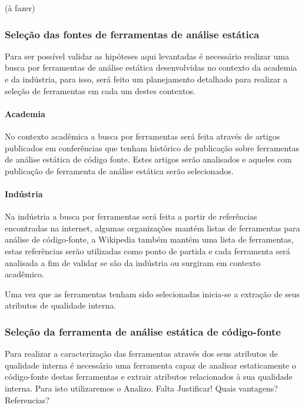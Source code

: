 \documentclass[12pt]{article}
\begin{document}
(à fazer)

\subsubsection{Seleção das fontes de ferramentas de análise estática}

Para ser possível validar as hipóteses aqui levantadas é necessário realizar
uma busca por ferramentas de análise estática desenvolvidas no contexto da
academia e da indústria, para isso, será feito um planejamento detalhado para
realizar a seleção de ferramentas em cada um destes contextos.

\paragraph{Academia} No contexto acadêmica a busca por ferramentas será feita
através de artigos publicados em conferências que tenham histórico de
publicação sobre ferramentas de análise estática de código fonte. Estes
artigos serão analisados e aqueles com publicação de ferramenta de análise
estática serão selecionados.

\paragraph{Indústria} Na indústria a busca por ferramentas será feita a partir
de referências encontradas na internet, algumas organizações mantém listas de
ferramentas para análise de código-fonte, a Wikipedia também mantém uma lista
de ferramentas, estas referências serão utilizadas como ponto de partida e
cada ferramenta será analisada a fim de validar se são da indústria ou
surgiram em contexto acadêmico.

Uma vez que as ferramentas tenham sido selecionadas inicia-se a extração de
seus atributos de qualidade interna.

\subsubsection{Seleção da ferramenta de análise estática de código-fonte}

Para realizar a caracterização das ferramentas através dos seus atributos de
qualidade interna é necessário uma ferramenta capaz de analisar estaticamente
o código-fonte destas ferramentas e extrair atributos relacionados à sua
qualidade interna. Para isto utilizaremos o Analizo\cite{Terceiro2010}. Falta
Justificar! Quais vantagens? Referencias?
\end{document}
